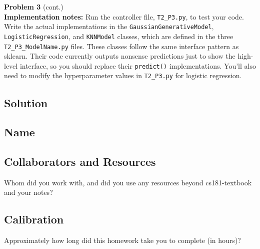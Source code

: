 \documentclass[submit]{harvardml}
\begin{document}
\newpage

\begin{framed}
\noindent\textbf{Problem 3} (cont.)\\


\textbf{Implementation notes:} Run the controller file, \texttt{T2\_P3.py},
to test your code. Write the actual implementations in the \texttt{GaussianGenerativeModel},
\texttt{LogisticRegression}, and \texttt{KNNModel} classes, which are defined in the three
\texttt{T2\_P3\_ModelName.py} files. These classes follow the same interface pattern
as sklearn. Their code
currently outputs nonsense predictions just to show the
high-level interface, so you should replace their \texttt{predict()} implementations.
You'll also need to modify the hyperparameter
values in \texttt{T2\_P3.py} for logistic regression.
\end{framed}


\subsection*{Solution}

\newpage
\subsection*{Name}

\subsection*{Collaborators and Resources}
Whom did you work with, and did you use any resources beyond cs181-textbook and your notes?

\subsection*{Calibration}
Approximately how long did this homework take you to complete (in hours)?
\end{document}
